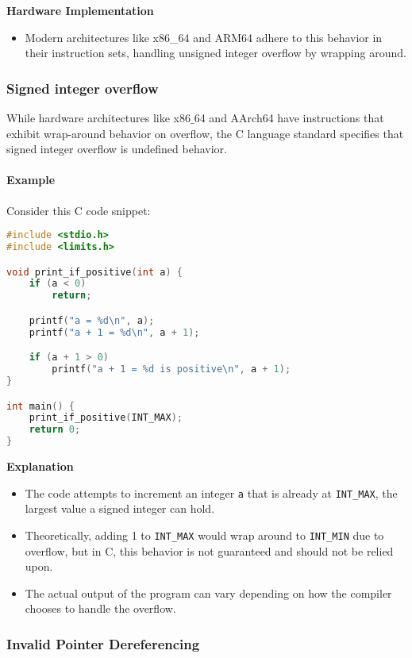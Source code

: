 \documentclass[12pt]{article}
\begin{document}
\textbf{Hardware Implementation}

\begin{itemize}
    \item Modern architectures like x86\_64 and ARM64 adhere to this behavior in their instruction sets, handling unsigned integer overflow by wrapping around.
\end{itemize}

\subsubsection{Signed integer overflow}

While hardware architectures like x86$\_$64 and AArch64 have instructions that exhibit wrap-around behavior on overflow, the C language standard specifies that signed integer overflow is undefined behavior.

\paragraph{Example}

Consider this C code snippet:

\begin{lstlisting}[language=C]
#include <stdio.h>
#include <limits.h>

void print_if_positive(int a) {
    if (a < 0)
        return;

    printf("a = %d\n", a);
    printf("a + 1 = %d\n", a + 1);

    if (a + 1 > 0)
        printf("a + 1 = %d is positive\n", a + 1);
}

int main() {
    print_if_positive(INT_MAX);
    return 0;
}
\end{lstlisting}

\textbf{Explanation}
\begin{itemize}
    \item The code attempts to increment an integer \texttt{a} that is already at \texttt{INT\_MAX}, the largest value a signed integer can hold.
    \item Theoretically, adding 1 to \texttt{INT\_MAX} would wrap around to \texttt{INT\_MIN} due to overflow, but in C, this behavior is not guaranteed and should not be relied upon.
    \item The actual output of the program can vary depending on how the compiler chooses to handle the overflow.
\end{itemize}


\subsubsection{Invalid Pointer Dereferencing}
\end{document}
